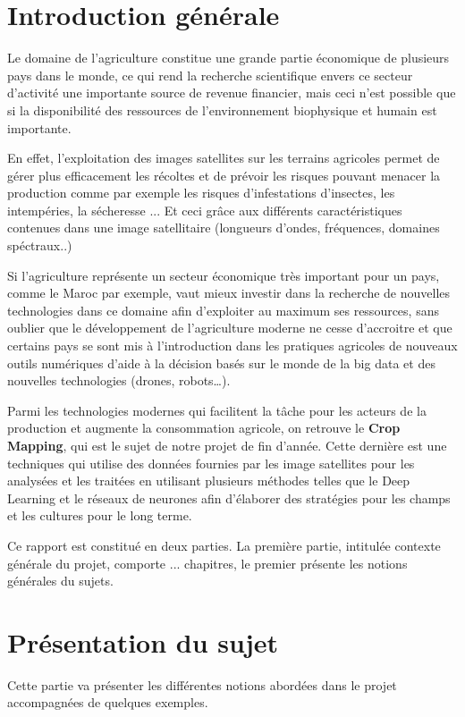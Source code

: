 \documentclass[12pt, openany]{report}
\begin{document}
\newpage
\strut 


\listoffigures
\tableofcontents
\chapter*{Introduction générale}

Le domaine de l’agriculture constitue une grande partie économique de plusieurs pays dans le monde, ce qui rend la recherche scientifique envers ce secteur d’activité une importante source de revenue financier, mais ceci n’est possible que si la disponibilité des ressources de l’environnement biophysique et humain est importante.
\par
En effet, l’exploitation des images satellites sur les terrains agricoles permet de gérer plus efficacement les récoltes et de prévoir les risques pouvant menacer la production comme par exemple les risques d’infestations d’insectes, les intempéries, la sécheresse ... Et ceci grâce aux différents caractéristiques contenues dans une image satellitaire (longueurs d’ondes, fréquences, domaines spéctraux..)
\par
Si l’agriculture représente un secteur économique très important pour un pays, comme le Maroc par exemple, vaut mieux investir dans la recherche de nouvelles technologies dans ce domaine afin d’exploiter au maximum ses ressources, sans oublier que le développement de l’agriculture moderne ne cesse d’accroitre et que certains pays se sont mis à l’introduction dans les pratiques agricoles de nouveaux outils numériques d’aide à la décision basés sur le monde de la big data et des nouvelles technologies (drones, robots…).
\par
Parmi les technologies modernes qui facilitent la tâche pour les acteurs de la production et augmente la consommation	 agricole, on retrouve le \textbf{Crop Mapping}, qui est le sujet de notre projet de fin d’année.  Cette dernière est une techniques qui utilise des données fournies par les image satellites pour les analysées et les traitées en utilisant plusieurs méthodes telles que le Deep Learning et le réseaux de neurones afin d’élaborer des stratégies pour les champs et les cultures pour le long terme.
\par
Ce rapport est constitué en deux parties. La première partie, intitulée contexte générale du projet, comporte ... chapitres, le premier présente les notions générales du sujets.


\chapter{Présentation du sujet}
Cette partie va présenter les différentes notions abordées dans le projet accompagnées de quelques exemples. 
\end{document}
